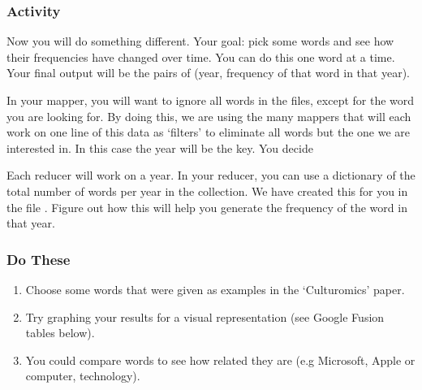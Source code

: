 \documentclass[letterpaper,10pt,openany,oneside]{sphinxmanual}
\begin{document}
\subsubsection{Activity}
\label{WmrActivities/WmrActivities:id4}
Now you will do something different. Your goal: pick some words and
see how their frequencies have changed over time. You can do this
one word at a time. Your final output will be the pairs of (year,
frequency of that word in that year).

In your mapper, you will want to ignore all words in the files,
except for the word you are looking for. By doing this, we are
using the many mappers that will each work on one line of this data
as `filters' to eliminate all words but the one we are interested
in. In this case the year will be the key. You decide

Each reducer will work on a year. In your reducer, you can use a
dictionary of the total number of words per year in the collection.
We have created this for you in the file .
Figure out how this will help you generate the frequency of the
word in that year.


\subsubsection{Do These}
\label{WmrActivities/WmrActivities:do-these}\begin{enumerate}
\item {} 
Choose some words that were given as examples in the
`Culturomics' paper.

\item {} 
Try graphing your results for a visual representation (see
Google Fusion tables below).

\item {} 
You could compare words to see how related they are (e.g
Microsoft, Apple or computer, technology).

\end{enumerate}
\end{document}
